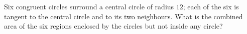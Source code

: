 Six congruent circles surround a central circle of radius $12$; each of the six is tangent to the central circle and to its two neighbours. What is the combined area of the six regions enclosed by the circles but not inside any circle?
